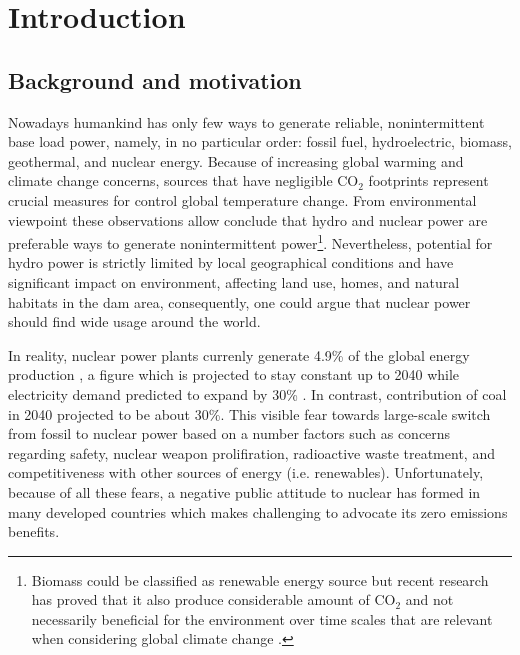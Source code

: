 \chapter[Introduction]{Introduction}

\section{Background and motivation}

Nowadays humankind has only few ways to generate reliable, nonintermittent base load power, namely, in no particular order: fossil fuel, hydroelectric, biomass, geothermal, and nuclear energy. Because of increasing global warming and climate change concerns, sources that have negligible CO$_2$ footprints represent crucial measures for control global temperature change. From environmental viewpoint these observations allow conclude that hydro and nuclear power are preferable ways to generate nonintermittent power\footnote{Biomass could be classified as renewable energy source but recent research has proved that it also produce considerable amount of CO$_2$ and not necessarily beneficial for the environment over time scales that are relevant when considering global climate change \cite{cherubini_co2_2011}.}. Nevertheless, potential for hydro power is strictly limited by local geographical conditions and have significant impact on environment, affecting land use, homes, and natural habitats in the dam area, consequently, one could argue that nuclear power should find wide usage around the world. 
 
In reality, nuclear power plants currenly generate 4.9\% of the global energy production \cite{noauthor_key_2017}, a figure which is projected to stay constant up to 2040 while electricity demand predicted to expand by 30\% \cite{noauthor_world_2017}. In contrast, contribution of coal in 2040 projected to be about 30\%. This visible fear towards large-scale switch from fossil to nuclear power based on a number factors such as concerns regarding safety, nuclear weapon prolifiration, radioactive waste treatment, and competitiveness with other sources of energy (i.e. renewables). Unfortunately, because of all these fears, a negative public attitude to nuclear has formed in many developed countries which makes challenging to advocate its zero emissions benefits.

